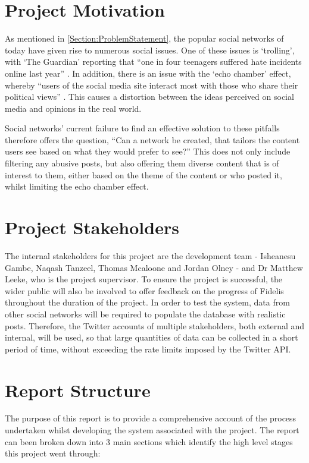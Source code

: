 \section{Project Motivation}
As mentioned in \ref{Section:ProblemStatement}, the popular social networks of today have given rise to numerous social issues. One of these issues is `trolling', with `The Guardian' reporting that ``one in four teenagers suffered hate incidents online last year'' \cite{Gani:Trolling}. In addition, there is an issue with the `echo chamber' effect, whereby ``users of the social media site interact most with those who share their political views'' \cite{Jackson:EchoChamber}. This causes a distortion between the ideas perceived on social media and opinions in the real world.

Social networks' current failure to find an effective solution to these pitfalls therefore offers the question, ``Can a network be created, that tailors the content users see based on what they would prefer to see?'' This does not only include filtering any abusive posts, but also offering them diverse content that is of interest to them, either based on the theme of the content or who posted it, whilst limiting the echo chamber effect.

\section{Project Stakeholders}
The internal stakeholders for this project are the development team - Isheanesu Gambe, Naqash Tanzeel, Thomas Mcaloone and Jordan Olney - and Dr Matthew Leeke, who is the project supervisor. To ensure the project is successful, the wider public will also be involved to offer feedback on the progress of Fidelis throughout the duration of the project. In order to test the system, data from other social networks will be required to populate the database with realistic posts. Therefore, the Twitter accounts of multiple stakeholders, both external and internal, will be used, so that large quantities of data can be collected in a short period of time, without exceeding the rate limits imposed by the Twitter API.

\section{Report Structure}
The purpose of this report is to provide a comprehensive account of the process undertaken whilst developing the system associated with the project. The report can been broken down into 3 main sections which identify the high level stages this project went through:

